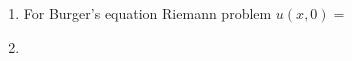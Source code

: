 \documentclass[11pt, oneside]{article}
\begin{document}
\begin{enumerate}
  \item %
    For Burger's equation Riemann problem $u(x, 0) = $

  \item %
\end{enumerate}
\end{document}
